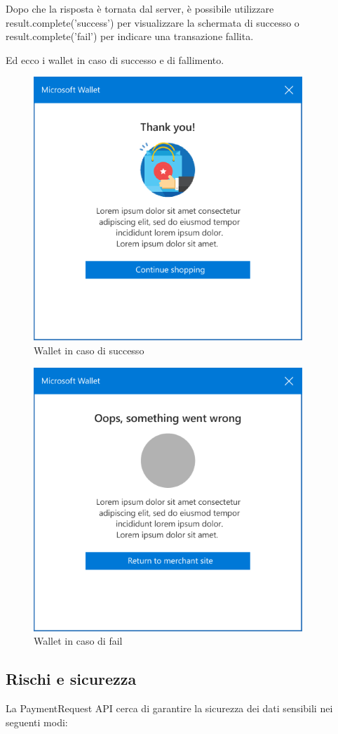 \documentclass[11pt ,a4paper , twoside , openright ]{article}
\begin{document}
Dopo che la risposta è tornata dal server, è possibile utilizzare result.complete('success') per visualizzare la schermata di successo o result.complete('fail') per indicare una transazione fallita.

\pagebreak
Ed ecco i wallet in caso di successo e di fallimento.
\begin{figure}[h]
	\centering
	\includegraphics[width=0.5\linewidth]{wallet2}
	\caption{Wallet in caso di successo}
	\label{fig: Wallet in caso di successo}
\end{figure}
\begin{figure}[h]
	\centering
	\includegraphics[width=0.5\linewidth]{wallet3}
	\caption{Wallet in caso di fail}
	\label{fig: Wallet in caso di fail}
\end{figure}


\subsection{Rischi e sicurezza \cite{rif19}} 

La PaymentRequest API cerca di garantire la sicurezza dei dati sensibili nei seguenti modi:
\end{document}
